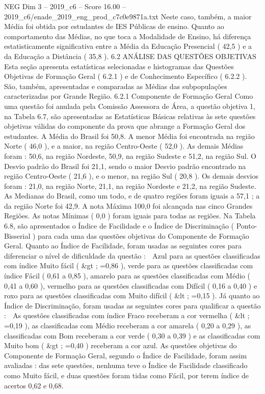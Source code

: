 \begin{textsample}{NEG Dim 3 – 2019\_c6 – Score 16.00 – 2019\_c6/enade\_2019\_eng\_prod\_c7c0e9871a.txt}
Neste caso, também, a maior Média foi obtida por estudantes de IES Públicas de ensino.
Quanto ao comportamento das Médias, no que toca a Modalidade de Ensino, há diferença estatisticamente significativa entre a Média da Educação Presencial ( 42,5 ) e a da Educação a Distância ( 35,8 ). 6.2 ANÁLISE DAS QUESTÕES OBJETIVAS Esta seção apresenta estatísticas selecionadas e histogramas das Questões Objetivas de Formação Geral ( 6.2.1 ) e de Conhecimento Específico ( 6.2.2 ).
São, também, apresentadas e comparadas as Médias das subpopulações caracterizadas por Grande Região. 6.2.1 Componente de Formação Geral Como uma questão foi anulada pela Comissão Assessora de Área, a questão objetiva 1, na Tabela 6.7, são apresentadas as Estatísticas Básicas relativas às sete questões objetivas válidas do componente da prova que abrange a Formação Geral dos estudantes.
A Média do Brasil foi 50,8.
A menor Média foi encontrada na região Norte ( 46,0 ), e a maior, na região Centro-Oeste ( 52,0 ).
As demais Médias foram : 50,6, na região Nordeste, 50,9, na região Sudeste e 51,2, na região Sul.
O Desvio padrão do Brasil foi 21,1, sendo o maior Desvio padrão encontrado na região Centro-Oeste ( 21,6 ), e o menor, na região Sul ( 20,8 ).
Os demais desvios foram : 21,0, na região Norte, 21,1, na região Nordeste e 21,2, na região Sudeste.
As Medianas do Brasil, como um todo, e de quatro regiões foram iguais a 57,1 ; a da região Norte foi 42,9.
A nota Máxima 100,0 foi alcançada nas cinco Grandes Regiões.
As notas Mínimas ( 0,0 ) foram iguais para todas as regiões.
Na Tabela 6.8, são apresentados o Índice de Facilidade e o Índice de Discriminação ( Ponto-Bisserial ) para cada uma das questões objetivas do Componente de Formação Geral.
Quanto ao Índice de Facilidade, foram usadas as seguintes cores para diferenciar o nível de dificuldade da questão :  Azul para as questões classificadas com índice Muito fácil ( \&gt ; =0,86 ), verde para as questões classificadas com índice Fácil ( 0,61 a 0,85 ), amarelo para as questões classificadas com Médio ( 0,41 a 0,60 ), vermelho para as questões classificadas com Difícil ( 0,16 a 0,40 ) e roxo para as questões classificadas com Muito difícil ( \&lt ; =0,15 ).
Já quanto ao Índice de Discriminação, foram usadas as seguintes cores para qualificar a questão :  As questões classificadas com índice Fraco receberam a cor vermelha ( \&lt ; =0,19 ), as classificadas com Médio receberam a cor amarela ( 0,20 a 0,29 ), as classificadas com Bom receberam a cor verde ( 0,30 a 0,39 ) e as classificadas com Muito bom ( \&gt ; =0,40 ) receberam a cor azul.
As questões objetivas do Componente de Formação Geral, segundo o Índice de Facilidade, foram assim avaliadas : das sete questões, nenhuma teve o Índice de Facilidade classificado como Muito fácil, e duas questões foram tidas como Fácil, por terem índice de acertos 0,62 e 0,68.

\end{textsample}
